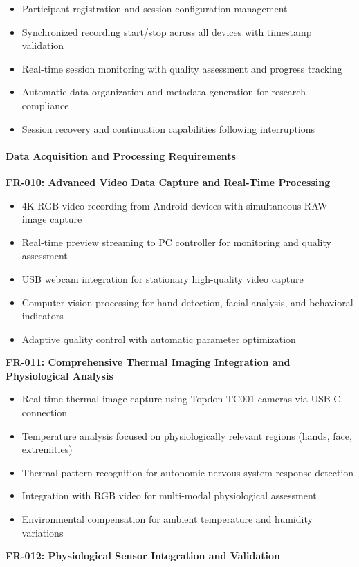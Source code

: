 \documentclass[12pt,a4paper]{report}
\begin{document}
\begin{itemize}
\item Participant registration and session configuration management
\item Synchronized recording start/stop across all devices with timestamp validation
\item Real-time session monitoring with quality assessment and progress tracking
\item Automatic data organization and metadata generation for research compliance
\item Session recovery and continuation capabilities following interruptions

\end{itemize}
\paragraph{Data Acquisition and Processing Requirements}

\textbf{FR-010: Advanced Video Data Capture and Real-Time Processing}

\begin{itemize}
\item 4K RGB video recording from Android devices with simultaneous RAW image capture
\item Real-time preview streaming to PC controller for monitoring and quality assessment
\item USB webcam integration for stationary high-quality video capture
\item Computer vision processing for hand detection, facial analysis, and behavioral indicators
\item Adaptive quality control with automatic parameter optimization

\end{itemize}
\textbf{FR-011: Comprehensive Thermal Imaging Integration and Physiological Analysis}

\begin{itemize}
\item Real-time thermal image capture using Topdon TC001 cameras via USB-C connection
\item Temperature analysis focused on physiologically relevant regions (hands, face, extremities)
\item Thermal pattern recognition for autonomic nervous system response detection
\item Integration with RGB video for multi-modal physiological assessment
\item Environmental compensation for ambient temperature and humidity variations

\end{itemize}
\textbf{FR-012: Physiological Sensor Integration and Validation}
\end{document}
